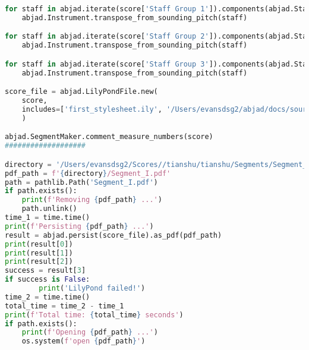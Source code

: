 \begin{lstlisting}[language=Python, caption=Tianshu Segment\_I]
for staff in abjad.iterate(score['Staff Group 1']).components(abjad.Staff):
    abjad.Instrument.transpose_from_sounding_pitch(staff)

for staff in abjad.iterate(score['Staff Group 2']).components(abjad.Staff):
    abjad.Instrument.transpose_from_sounding_pitch(staff)

for staff in abjad.iterate(score['Staff Group 3']).components(abjad.Staff):
    abjad.Instrument.transpose_from_sounding_pitch(staff)

score_file = abjad.LilyPondFile.new(
    score,
    includes=['first_stylesheet.ily', '/Users/evansdsg2/abjad/docs/source/_stylesheets/abjad.ily'],
    )

abjad.SegmentMaker.comment_measure_numbers(score)
###################

directory = '/Users/evansdsg2/Scores//tianshu/tianshu/Segments/Segment_I'
pdf_path = f'{directory}/Segment_I.pdf'
path = pathlib.Path('Segment_I.pdf')
if path.exists():
    print(f'Removing {pdf_path} ...')
    path.unlink()
time_1 = time.time()
print(f'Persisting {pdf_path} ...')
result = abjad.persist(score_file).as_pdf(pdf_path)
print(result[0])
print(result[1])
print(result[2])
success = result[3]
if success is False:
        print('LilyPond failed!')
time_2 = time.time()
total_time = time_2 - time_1
print(f'Total time: {total_time} seconds')
if path.exists():
    print(f'Opening {pdf_path} ...')
    os.system(f'open {pdf_path}')
\end{lstlisting}
\doublespace


